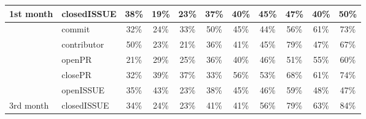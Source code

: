 \documentclass[smallextended]{svjour3}
\begin{document}
\begin{table}[!t]
{\begin{tabular}{llccccccccc}
\multirow{-6}{*}{1st month}          & closedISSUE                          & \cellcolor[HTML]{D5D5D5}38\% & \cellcolor[HTML]{F0F0F0}19\% & \cellcolor[HTML]{EAEAEA}23\% & \cellcolor[HTML]{D7D7D7}37\% & \cellcolor[HTML]{D2D2D2}40\% & \cellcolor[HTML]{C9C9C9}45\% & \cellcolor[HTML]{C4C4C4}47\% & \cellcolor[HTML]{D2D2D2}40\% & \cellcolor[HTML]{BCBCBC}50\% \\ \hline
                                     & commit                               & \cellcolor[HTML]{DDDDDD}32\% & \cellcolor[HTML]{E9E9E9}24\% & \cellcolor[HTML]{DCDCDC}33\% & \cellcolor[HTML]{BDBDBD}50\% & \cellcolor[HTML]{CBCBCB}45\% & \cellcolor[HTML]{CCCCCC}44\% & \cellcolor[HTML]{AEAEAE}56\% & \cellcolor[HTML]{A2A2A2}61\% & \cellcolor[HTML]{828282}73\% \\
                                     & contributor                          & \cellcolor[HTML]{BEBEBE}50\% & \cellcolor[HTML]{EAEAEA}23\% & \cellcolor[HTML]{EDEDED}21\% & \cellcolor[HTML]{D8D8D8}36\% & \cellcolor[HTML]{D1D1D1}41\% & \cellcolor[HTML]{CACACA}45\% & \cellcolor[HTML]{747474}79\% & \cellcolor[HTML]{C6C6C6}47\% & \cellcolor[HTML]{929292}67\% \\
                                     & openPR                               & \cellcolor[HTML]{EEEEEE}21\% & \cellcolor[HTML]{E2E2E2}29\% & \cellcolor[HTML]{E7E7E7}25\% & \cellcolor[HTML]{D8D8D8}36\% & \cellcolor[HTML]{D3D3D3}40\% & \cellcolor[HTML]{C8C8C8}46\% & \cellcolor[HTML]{BBBBBB}51\% & \cellcolor[HTML]{AFAFAF}55\% & \cellcolor[HTML]{A3A3A3}60\% \\
                                     & closePR                              & \cellcolor[HTML]{DEDEDE}32\% & \cellcolor[HTML]{D4D4D4}39\% & \cellcolor[HTML]{D7D7D7}37\% & \cellcolor[HTML]{DCDCDC}33\% & \cellcolor[HTML]{AEAEAE}56\% & \cellcolor[HTML]{B6B6B6}53\% & \cellcolor[HTML]{8E8E8E}68\% & \cellcolor[HTML]{A0A0A0}61\% & \cellcolor[HTML]{808080}74\% \\
                                     & openISSUE                            & \cellcolor[HTML]{D9D9D9}35\% & \cellcolor[HTML]{CECECE}43\% & \cellcolor[HTML]{EAEAEA}23\% & \cellcolor[HTML]{D5D5D5}38\% & \cellcolor[HTML]{CACACA}45\% & \cellcolor[HTML]{C7C7C7}46\% & \cellcolor[HTML]{A7A7A7}59\% & \cellcolor[HTML]{C2C2C2}48\% & \cellcolor[HTML]{C5C5C5}47\% \\
\multirow{-6}{*}{3rd month}          & closedISSUE                          & \cellcolor[HTML]{DBDBDB}34\% & \cellcolor[HTML]{E9E9E9}24\% & \cellcolor[HTML]{EAEAEA}23\% & \cellcolor[HTML]{D0D0D0}41\% & \cellcolor[HTML]{D1D1D1}41\% & \cellcolor[HTML]{AEAEAE}56\% & \cellcolor[HTML]{737373}79\% & \cellcolor[HTML]{9D9D9D}63\% & \cellcolor[HTML]{666666}84\% \\ \hline

\end{tabular}}
\end{table}
\end{document}
